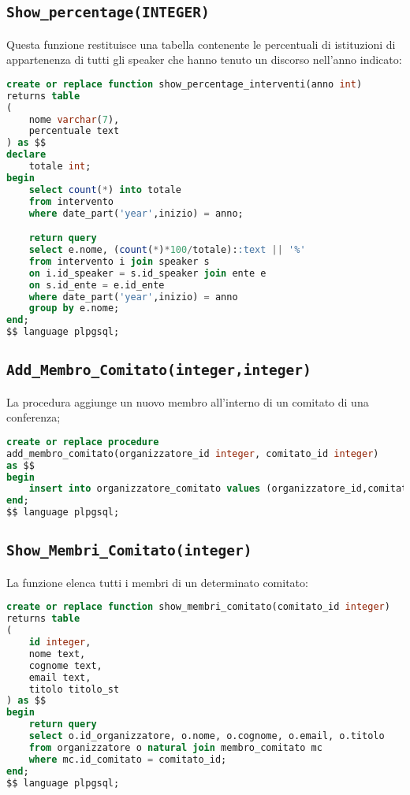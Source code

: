 \subsection{\texttt{Show\_percentage(INTEGER)}}
Questa funzione restituisce una tabella contenente le percentuali di istituzioni di appartenenza di tutti gli speaker che hanno tenuto un discorso nell'anno indicato:
\begin{lstlisting}[language=SQL,style=mystyle]
create or replace function show_percentage_interventi(anno int)
returns table
(
    nome varchar(7),
    percentuale text
) as $$
declare
    totale int;
begin
    select count(*) into totale
    from intervento
    where date_part('year',inizio) = anno;

    return query
    select e.nome, (count(*)*100/totale)::text || '%'
    from intervento i join speaker s 
    on i.id_speaker = s.id_speaker join ente e 
    on s.id_ente = e.id_ente
    where date_part('year',inizio) = anno
    group by e.nome;
end;
$$ language plpgsql;
\end{lstlisting}
\subsection{\texttt{Add\_Membro\_Comitato(integer,integer)}}
La procedura aggiunge un nuovo membro all'interno di un comitato di una conferenza;
\begin{lstlisting}[language=SQL,style=mystyle]
create or replace procedure 
add_membro_comitato(organizzatore_id integer, comitato_id integer)
as $$
begin
    insert into organizzatore_comitato values (organizzatore_id,comitato_id);
end;
$$ language plpgsql;
\end{lstlisting}
\subsection{\texttt{Show\_Membri\_Comitato(integer)}}
La funzione elenca tutti i membri di un determinato comitato:
\begin{lstlisting}[language=SQL,style=mystyle]
create or replace function show_membri_comitato(comitato_id integer)
returns table
(
    id integer,
    nome text,
    cognome text,
    email text,
    titolo titolo_st
) as $$
begin
    return query
    select o.id_organizzatore, o.nome, o.cognome, o.email, o.titolo
    from organizzatore o natural join membro_comitato mc
    where mc.id_comitato = comitato_id;
end;
$$ language plpgsql;
\end{lstlisting}
